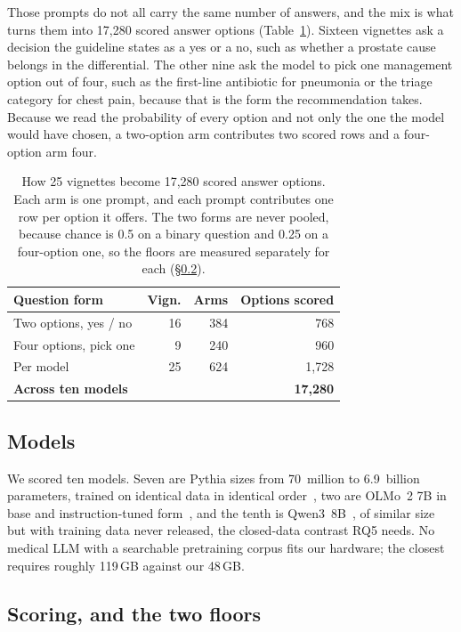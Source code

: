 \documentclass[11pt,twocolumn]{article}
\begin{document}
Those prompts do not all carry the same number of answers, and the mix is what
turns them into 17,280 scored answer options (Table~\ref{tab:options}). Sixteen
vignettes ask a decision the guideline states as a yes or a no, such as whether
a prostate cause belongs in the differential. The other nine ask the model to
pick one management option out of four, such as the first-line antibiotic for
pneumonia or the triage category for chest pain, because that is the form the
recommendation takes. Because we read the probability of every option and not
only the one the model would have chosen, a two-option arm contributes two
scored rows and a four-option arm four.

\begin{table}[!t]\centering\footnotesize
\caption{How 25 vignettes become 17,280 scored answer options. Each arm is one
prompt, and each prompt contributes one row per option it offers. The two forms
are never pooled, because chance is 0.5 on a binary question and 0.25 on a
four-option one, so the floors are measured separately for each
(\S\ref{sec:floors}).}
\label{tab:options}
\begin{tabular}{@{}lrrr@{}}
\toprule
\textbf{Question form} & \textbf{Vign.} & \textbf{Arms} & \textbf{Options scored} \\
\midrule
\rowcolor{rose} Two options, yes / no & 16 & 384 & 768 \\
Four options, pick one & 9 & 240 & 960 \\
\midrule
Per model & 25 & 624 & 1{,}728 \\
\rowcolor{redt} \textbf{Across ten models} & & & \textbf{17{,}280} \\
\bottomrule
\end{tabular}
\end{table}

\subsection{Models}

We scored ten models. Seven are Pythia sizes from 70~million to 6.9~billion
parameters, trained on identical data in identical order~\cite{r6}, two are
OLMo~2 7B in base and instruction-tuned form~\cite{r7}, and the tenth is
Qwen3~8B~\cite{r23}, of similar size but with training data never released, the
closed-data contrast RQ5 needs. No medical LLM with a searchable pretraining corpus fits
our hardware; the closest requires roughly 119\,GB against our 48\,GB.

\subsection{Scoring, and the two floors}
\label{sec:floors}
\end{document}
